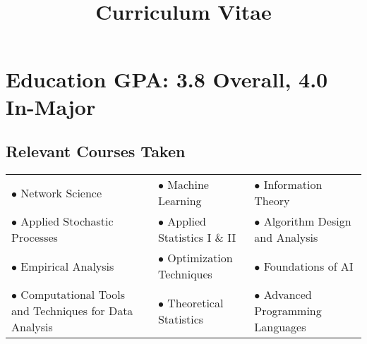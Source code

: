 \documentclass[11pt,a4paper,sans]{moderncv} %
\title{\\ Curriculum Vitae}
\begin{document}


%
%
%
%
%


\makecvtitle %


\section{Education  \hfill \normalsize GPA: 3.8 Overall, 4.0 In-Major}

\subsection{Relevant Courses Taken}
\begin{center}
\begin{tabularx}{\linewidth}{ X X X }
 $\bullet$ Network Science &  $\bullet$ Machine Learning & $\bullet$ Information Theory  \\ 
 $\bullet$ Applied Stochastic Processes & $\bullet$ Applied Statistics I \& II  & $\bullet$ Algorithm Design and Analysis  \\
  $\bullet$ Empirical Analysis & $\bullet$ Optimization Techniques & $\bullet$ Foundations of AI  \\  
 $\bullet$ Computational Tools and \; \mbox{Techniques} for Data Analysis &  $\bullet$ Theoretical Statistics & $\bullet$ Advanced Programming Languages

\end{tabularx}
\end{center}
\end{document}
